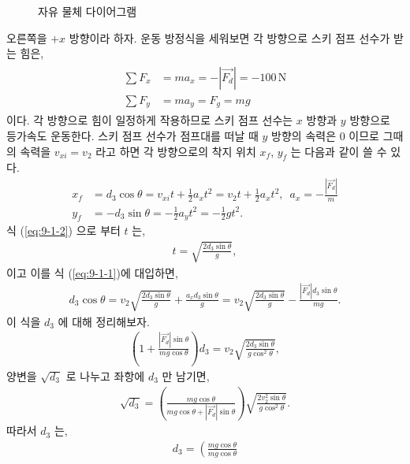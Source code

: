 \documentclass[floatfix,nofootinbib,superscriptaddress,fleqn]{revtex4-2}
\begin{document}
\begin{itemize}
\begin{figure}[h]
 \caption{자유 물체 다이어그램}
  \end{figure}
  오른쪽을 $+x$ 방향이라 하자. 운동 방정식을 세워보면 각 방향으로 스키 점프 선수가 받는 힘은,
  \begin{align}
    \begin{split}
      \sum F_x &= ma_x = -|\vec{F_d}| = -100\,\mathrm{N} \\
      \sum F_y &= ma_y = F_g = mg 
    \end{split}
  \end{align}
  이다. 각 방향으로 힘이 일정하게 작용하므로 스키 점프 선수는 
  $x$ 방향과 $y$ 방향으로 등가속도 운동한다. 스키 점프 선수가 
  점프대를 떠날 때 $y$ 방향의 속력은 0 이므로 
  그때의 속력을 $v_{xi}=v_2$ 라고 하면 각 방향으로의 착지 위치 $x_f$, $y_f$ 
  는 다음과 같이 쓸 수 있다.
  \begin{align}\label{eq:9-1-1}
      x_f &=d_3\cos{\theta}= v_{xi}t+\frac{1}{2}a_xt^2 
      = v_2t+\frac{1}{2}a_xt^2,\,\,\,
      a_x=-\frac{|\vec{F_d}|}{m}  \\ \label{eq:9-1-2}
      y_f &=-d_3\sin{\theta}= -\frac{1}{2}a_yt^2 
      = -\frac{1}{2}gt^2.
  \end{align}
  식 (\ref{eq:9-1-2}) 으로 부터 $t$ 는,
  \begin{align}\label{eq:9-2}
    t = \sqrt{\frac{2d_3\sin{\theta}}{g}},
  \end{align}
  이고 이를 식 (\ref{eq:9-1-1})에 대입하면,
  \begin{align}
    d_3\cos{\theta}=v_2\sqrt{\frac{2d_3\sin{\theta}}{g}}
    +\frac{a_xd_3\sin{\theta}}{g}
    =v_2\sqrt{\frac{2d_3\sin{\theta}}{g}}
    -\frac{|\vec{F_d}|d_3\sin{\theta}}{mg}.
  \end{align}
  이 식을 $d_3$ 에 대해 정리해보자.
  \begin{align}
    \left(1+\frac{|\vec{F_d}|\sin{\theta}}{mg\cos{\theta}}\right)d_3
    =v_2\sqrt{\frac{2d_3\sin{\theta}}{g\cos^2{\theta}}},
  \end{align}
  양변을 $\sqrt{d_3}$ 로 나누고 좌항에 $d_3$ 만 남기면,
  \begin{align}
    \sqrt{d_3}=\left(\frac{mg\cos{\theta}}{mg\cos{\theta}
    +|\vec{F_d}|\sin{\theta}}\right)
    \sqrt{\frac{2v_2^2\sin{\theta}}{g\cos^2{\theta}}}.
  \end{align}
  따라서 $d_3$ 는,
  \begin{align}
    d_3=\left(\frac{mg\cos{\theta}}{mg\cos{\theta}
}
\end{align}
\end{itemize}
\end{document}
